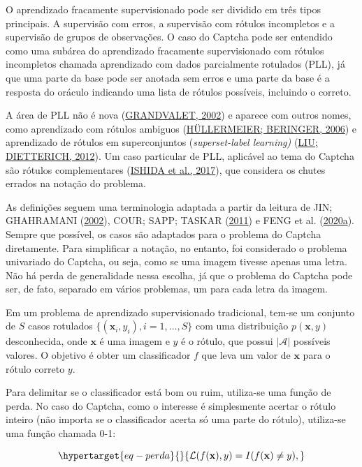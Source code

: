 \documentclass[12pt,twoside,brazilian]{book}
\begin{document}
O aprendizado fracamente supervisionado pode ser dividido em três tipos
principais. A supervisão com erros, a supervisão com rótulos incompletos
e a supervisão de grupos de observações. O caso do Captcha pode ser
entendido como uma subárea do aprendizado fracamente supervisionado com
rótulos incompletos chamada aprendizado com dados parcialmente rotulados
(PLL), já que uma parte da base pode ser anotada sem erros e uma parte
da base é a resposta do oráculo indicando uma lista de rótulos
possíveis, incluindo o correto.

A área de PLL não é nova
(\protect\hyperlink{ref-grandvalet2002}{GRANDVALET, 2002}) e aparece com
outros nomes, como aprendizado com rótulos ambiguos
(\protect\hyperlink{ref-hullermeier2006}{HÜLLERMEIER; BERINGER, 2006}) e
aprendizado de rótulos em superconjuntos (\emph{superset-label
learning)} (\protect\hyperlink{ref-liu2012}{LIU; DIETTERICH, 2012}). Um
caso particular de PLL, aplicável ao tema do Captcha são rótulos
complementares (\protect\hyperlink{ref-ishida2017}{ISHIDA et al.,
2017}), que considera os chutes errados na notação do problema.

As definições seguem uma terminologia adaptada a partir da leitura de
JIN; GHAHRAMANI (\protect\hyperlink{ref-jin2002}{2002}), COUR; SAPP;
TASKAR (\protect\hyperlink{ref-cour2011}{2011}) e FENG et al.
(\protect\hyperlink{ref-feng2020}{2020a}). Sempre que possível, os casos
são adaptados para o problema do Captcha diretamente. Para simplificar a
notação, no entanto, foi considerado o problema univariado do Captcha,
ou seja, como se uma imagem tivesse apenas uma letra. Não há perda de
generalidade nessa escolha, já que o problema do Captcha pode ser, de
fato, separado em vários problemas, um para cada letra da imagem.

Em um problema de aprendizado supervisionado tradicional, tem-se um
conjunto de \(S\) casos rotulados
\(\{(\mathbf x_i,y_i), i=1,\dots, S\}\) com uma distribuição
\(p(\mathbf x,y)\) desconhecida, onde \(\mathbf x\) é uma imagem e \(y\)
é o rótulo, que possui \(|\mathcal A|\) possíveis valores. O objetivo é
obter um classificador \(f\) que leva um valor de \(\mathbf x\) para o
rótulo correto \(y\).

Para delimitar se o classificador está bom ou ruim, utiliza-se uma
função de perda. No caso do Captcha, como o interesse é simplesmente
acertar o rótulo inteiro (não importa se o classificador acerta só uma
parte do rótulo), utiliza-se uma função chamada 0-1:

\begin{equation}\protect\hypertarget{eq-perda}{}{
\mathcal L(f(\mathbf x),y) = I (f(\mathbf x) \neq y),
}\label{eq-perda}\end{equation}
\end{document}
